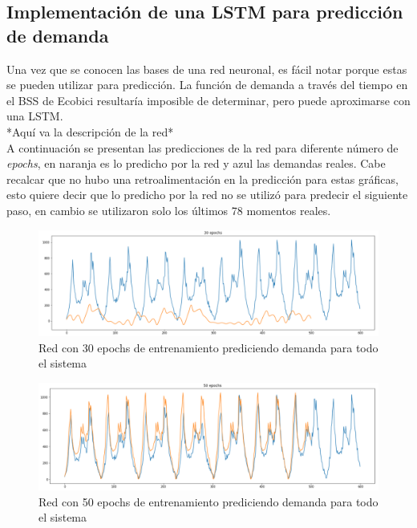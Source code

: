 \documentclass[12pt,spanish]{article}
\begin{document}
	\subsection{Implementación de una LSTM para predicción de demanda}
	Una vez que se conocen las bases de una red neuronal, es fácil notar porque estas se pueden utilizar para predicción. La función de demanda a través del tiempo en el BSS de Ecobici resultaría imposible de determinar, pero puede aproximarse con una LSTM.\\
	*Aquí va la descripción de la red*\\
	A continuación se presentan las predicciones de la red para diferente número de \textit{epochs}, en naranja es lo predicho por la red y azul las demandas reales. Cabe recalcar que no hubo una retroalimentación en la predicción para estas gráficas, esto quiere decir que lo predicho por la red no se utilizó para predecir el siguiente paso, en cambio se utilizaron solo los últimos 78 momentos reales.
	\begin{figure}[H]
		\centering
		\includegraphics[width=15cm]{Imagenes/full_30_epochs.PNG}
		\begin{centering}
			\caption{Red con 30 epochs de entrenamiento prediciendo demanda para todo el sistema}
		\end{centering}
	\end{figure}
	\begin{figure}[H]
		\centering
		\includegraphics[width=15cm]{Imagenes/full_50_epochs.PNG}
		\begin{centering}
			\caption{Red con 50 epochs de entrenamiento prediciendo demanda para todo el sistema}
		\end{centering}
	\end{figure}
\end{document}
